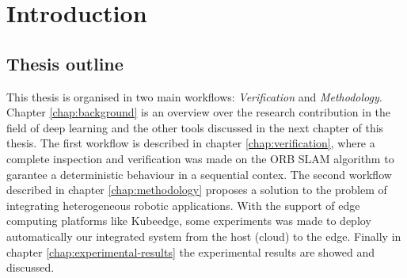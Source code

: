 \chapter{Introduction} 

\section{Thesis outline}
This thesis is organised in two main workflows: \textit{Verification} and \textit{Methodology}.
Chapter \ref{chap:background} is an overview over the research contribution in the field of  deep learning and the other tools discussed in the next chapter of this thesis.
The first workflow is described in chapter \ref{chap:verification}, where a complete inspection and verification was made on the ORB SLAM algorithm to garantee  a deterministic behaviour in a sequential contex.
The second workflow described in chapter \ref{chap:methodology} proposes a solution to the problem of integrating heterogeneous robotic applications.
With the support of edge computing platforms like Kubeedge, some experiments was made to deploy automatically our integrated system from the host (cloud) to the edge.
Finally in chapter \ref{chap:experimental-results} the experimental results are showed and discussed.



\thispagestyle{empty}